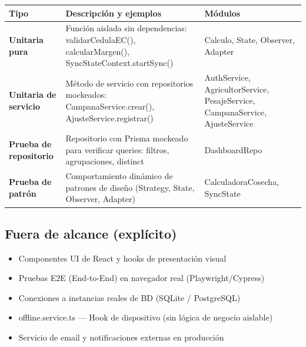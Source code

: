 \documentclass[12pt, a4paper]{article}
\newcommand{\code}[1]{\colorbox{CCodeBg}{\color{CCode}\ttfamily\small #1}}
\begin{document}
\begin{center}
\renewcommand{\arraystretch}{1.4}
\begin{tabularx}{\textwidth}{>{\bfseries}p{3.2cm} X >{\centering\arraybackslash}p{2.8cm}}
  \rowcolor{CRowAlt}
  \bfseries Tipo & \bfseries Descripción y ejemplos & \bfseries Módulos \\
  \midrule
  Unitaria pura & Función aislada sin dependencias: \code{validarCedulaEC()}, \code{calcularMargen()}, \code{SyncStateContext.startSync()} & Calculo, State, Observer, Adapter \\
  \rowcolor{CBg}
  Unitaria de servicio & Método de servicio con repositorios mockeados: \code{CampanaService.crear()}, \code{AjusteService.registrar()} & AuthService, AgricultorService, PesajeService, CampanaService, AjusteService \\
  Prueba de repositorio & Repositorio con Prisma mockeado para verificar queries: filtros, agrupaciones, distinct & DashboardRepo \\
  \rowcolor{CBg}
  Prueba de patrón & Comportamiento dinámico de patrones de diseño (Strategy, State, Observer, Adapter) & CalculadoraCosecha, SyncState \\
  \bottomrule
\end{tabularx}
\end{center}

\subsection{Fuera de alcance (explícito)}

\begin{itemize}[leftmargin=1.5em, itemsep=2pt]
  \item[\color{CTextMuted}$\oslash$] Componentes UI de React y hooks de presentación visual
  \item[\color{CTextMuted}$\oslash$] Pruebas E2E (End-to-End) en navegador real (Playwright/Cypress)
  \item[\color{CTextMuted}$\oslash$] Conexiones a instancias reales de BD (SQLite / PostgreSQL)
  \item[\color{CTextMuted}$\oslash$] \code{offline.service.ts} — Hook de dispositivo (sin lógica de negocio aislable)
  \item[\color{CTextMuted}$\oslash$] Servicio de email y notificaciones externas en producción
\end{itemize}

\newpage

\end{document}
